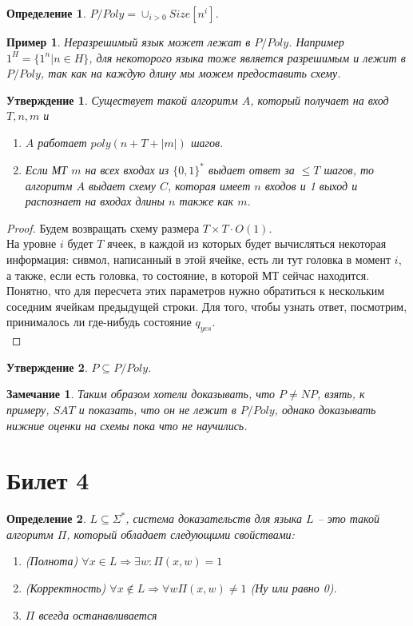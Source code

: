 \documentclass[12pt, letterpaper]{article}
\newtheorem{prop}{Утверждение}[section]
\newtheorem{defi}{Определение}[section]
\newtheorem{sample}{Пример}[section]
\newtheorem{note}{Замечание}[section]
\begin{document}
\begin{defi}
$P/Poly = \cup_{i>0} Size[n^i]$.
\end{defi}

\begin{sample}
Неразрешимый язык может лежат в $P/Poly$. Например $1^{H}=\{1^{n} | n \in H \}$, для некоторого языка тоже является разрешимым и лежит в $P/Poly$, так как на каждую длину мы можем предоставить схему.  
\end{sample}

\begin{prop}
Существует такой алгоритм $A$, который получает на вход $T,n,m$ и 
\begin{enumerate}
\item $A$ работает $poly(n + T + |m|)$ шагов.
\item Если МТ $m$ на всех входах из $\{0,1\}^{*}$ выдает ответ за $\leq T$ шагов, то алгоритм $A$ выдает схему $C$, которая имеет $n$ входов и 1 выход и распознает на входах длины $n$ также как $m$.
\end{enumerate}
\end{prop}
\begin{proof}
Будем возвращать схему размера $T \times T \cdot O(1)$.\\
На уровне $i$ будет $T$ ячеек, в каждой из которых будет вычисляться некоторая информация: сивмол, написанный в этой ячейке, есть ли тут головка в момент $i$, а также, если есть головка, то состояние, в которой МТ сейчас находится. Понятно, что для пересчета этих параметров нужно обратиться к нескольким соседним ячейкам предыдущей строки. Для того, чтобы узнать ответ, посмотрим, принималось ли где-нибудь состояние $q_{yes}$.\\
\end{proof}

\begin{prop}
$P \subseteq P/Poly$.
\end{prop}

\begin{note}
Таким образом хотели доказывать, что $P \neq NP$, взять, к примеру, $SAT$ и показать, что он не лежит в $P / Poly$, однако доказывать нижние оценки на схемы пока что не научились.
\end{note}

\section{Билет 4}
\begin{defi}
$L \subseteq \Sigma^{*}$, система доказательств для языка $L$ -- это такой алгоритм $\Pi$, который обладает следующими свойствами:
\begin{enumerate}
\item (Полнота) $\forall x \in L \Rightarrow \exists w : \Pi(x,w)=1$
\item (Корректность) $\forall x \notin L \Rightarrow \forall w \Pi(x,w) \neq 1$ 
(Ну или равно 0).
\item $\Pi$ всегда останавливается  
\end{enumerate}
\end{defi}
\end{document}
